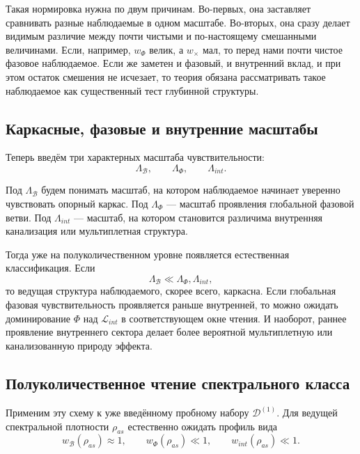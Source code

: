 \documentclass[12pt,a4paper]{article}
\begin{document}
Такая нормировка нужна по двум причинам. Во-первых, она заставляет сравнивать разные наблюдаемые в одном масштабе. Во-вторых, она сразу делает видимым различие между почти чистыми и по-настоящему смешанными величинами. Если, например, \(w_{\Phi}\) велик, а \(w_{\times}\) мал, то перед нами почти чистое фазовое наблюдаемое. Если же заметен и фазовый, и внутренний вклад, и при этом остаток смешения не исчезает, то теория обязана рассматривать такое наблюдаемое как существенный тест глубинной структуры.

\subsection{Каркасные, фазовые и внутренние масштабы}

Теперь введём три характерных масштаба чувствительности:
\begin{equation}
\Lambda_{\mathcal{B}}, \qquad \Lambda_{\Phi}, \qquad \Lambda_{int}.
\end{equation}

Под \(\Lambda_{\mathcal{B}}\) будем понимать масштаб, на котором наблюдаемое начинает уверенно чувствовать опорный каркас. Под \(\Lambda_{\Phi}\) --- масштаб проявления глобальной фазовой ветви. Под \(\Lambda_{int}\) --- масштаб, на котором становится различима внутренняя канализация или мультиплетная структура.

Тогда уже на полуколичественном уровне появляется естественная классификация. Если
\begin{equation}
\Lambda_{\mathcal{B}} \ll \Lambda_{\Phi}, \Lambda_{int},
\end{equation}
то ведущая структура наблюдаемого, скорее всего, каркасна. Если глобальная фазовая чувствительность проявляется раньше внутренней, то можно ожидать доминирование \(\Phi\) над \(\mathcal{L}_{int}\) в соответствующем окне чтения. И наоборот, раннее проявление внутреннего сектора делает более вероятной мультиплетную или канализованную природу эффекта.

\subsection{Полуколичественное чтение спектрального класса}

Применим эту схему к уже введённому пробному набору \(\mathcal{D}^{(1)}\). Для ведущей спектральной плотности \(\rho_{as}\) естественно ожидать профиль вида
\begin{equation}
w_{\mathcal{B}}(\rho_{as}) \approx 1,
\qquad
w_{\Phi}(\rho_{as}) \ll 1,
\qquad
w_{int}(\rho_{as}) \ll 1.
\end{equation}
\end{document}
